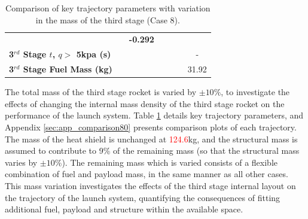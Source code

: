 \begin{table}[ht]
\begin{tabular}{l c c c c c c}
		& \textbf{\thirddExergyEffmThreeOneHundredTenNoReturn}
		& \textbf{-0.292}
		\\
		\textbf{3$^{rd}$ Stage $t$, $q >$ 5kpa (s)}
		& \thirdqOverFivemThreeNinetyNoReturn
		& \thirdqOverFivemThreeNinetyFiveNoReturn
		& \thirdqOverFivemThreeStandardNoReturn
		& \thirdqOverFivemThreeOneHundredFiveNoReturn
		& \thirdqOverFivemThreeOneHundredTenNoReturn
		& -
		\\
		\textbf{3$^{rd}$ Stage Fuel Mass (kg)}
		& \thirdmFuelmThreeNinetyNoReturn
		& \thirdmFuelmThreeNinetyFiveNoReturn
		& \thirdmFuelmThreeStandardNoReturn
		& \thirdmFuelmThreeOneHundredFiveNoReturn
		& \thirdmFuelmThreeOneHundredTenNoReturn
		&31.92
		\\
		\hline 
	\end{tabular} 
	\caption{Comparison of key trajectory parameters with variation in the mass of the third stage (Case 8).}
	\label{tab:comparison80}
\end{table}


The total mass of the third stage rocket is varied by $\pm10\%$, to investigate the effects of changing the internal mass density of the third stage rocket on the performance of the launch system. Table \ref{tab:comparison80} details key trajectory parameters, and Appendix \ref{sec:app_comparison80} presents comparison plots of each trajectory.
The mass of the heat shield is unchanged at \textcolor{red}{124.6}kg, and the structural mass is assumed to contribute to 9\% of the remaining mass (so that the structural mass varies by $\pm10\%$). The remaining mass which is varied consists of a flexible combination of fuel and payload mass, in the same manner as all other cases. 
This mass variation investigates the effects of the third stage internal layout on the trajectory of the launch system, quantifying the consequences of fitting additional fuel, payload and structure within the available space.

